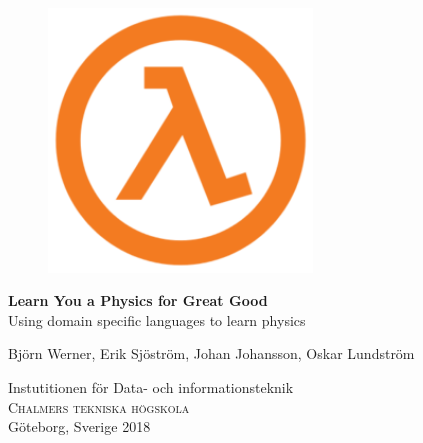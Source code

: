 
\begin{titlepage}

\addtolength{\voffset}{2cm}

\begin{figure}[H]
\centering
\vspace{2cm}	%
\includegraphics[height=7cm, width=0.7\linewidth]{figure/Lambda.png}
\end{figure}

\mbox{}
\vfill
\renewcommand{\familydefault}{\sfdefault} \normalfont %
\textbf{{\Huge 	Learn You a Physics for Great Good}} 	\\[0.5cm]
  {\Large Using domain specific languages to learn physics} \setlength{\parskip}{1cm}

{\Large Björn Werner, Erik Sjöström, Johan Johansson, Oskar Lundström} \setlength{\parskip}{2.9cm}

Instutitionen för Data- och informationsteknik \\
\textsc{Chalmers tekniska högskola} \\
Göteborg, Sverige 2018

\renewcommand{\familydefault}{\rmdefault} \normalfont %
\end{titlepage}


\newpage
\restoregeometry
\thispagestyle{empty}
\mbox{}


